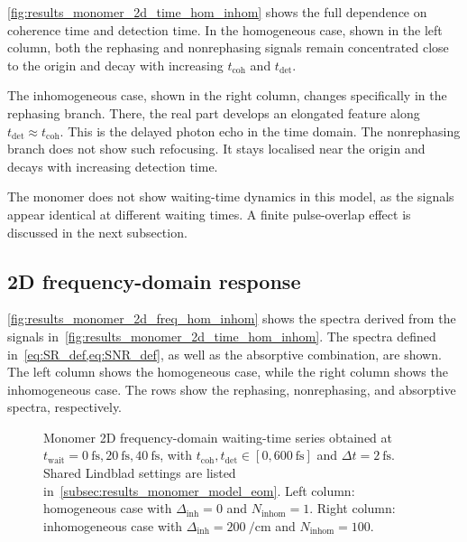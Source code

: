 \autoref{fig:results_monomer_2d_time_hom_inhom} shows the full dependence on coherence time and detection time. In the homogeneous case, shown in the left column, both the rephasing and nonrephasing signals remain concentrated close to the origin and decay with increasing $t_{\mathrm{coh}}$ and $t_{\mathrm{det}}$.

The inhomogeneous case, shown in the right column, changes specifically in the rephasing branch. There, the real part develops an elongated feature along $t_{\mathrm{det}} \approx t_{\mathrm{coh}}$. This is the delayed photon echo in the time domain. The nonrephasing branch does not show such refocusing. It stays localised near the origin and decays with increasing detection time.

The monomer does not show waiting-time dynamics in this model, as the signals appear identical at different waiting times. A finite pulse-overlap effect is discussed in the next subsection.

\subsection{2D frequency-domain response}
\label{subsec:results_monomer_2d_freq}

\autoref{fig:results_monomer_2d_freq_hom_inhom} shows the spectra derived from the signals in~\autoref{fig:results_monomer_2d_time_hom_inhom}. The spectra defined in~\autoref{eq:SR_def,eq:SNR_def}, as well as the absorptive combination, are shown. The left column shows the homogeneous case, while the right column shows the inhomogeneous case. The rows show the rephasing, nonrephasing, and absorptive spectra, respectively.

\begin{figure}[htbp]
    \centering
  \caption{Monomer 2D frequency-domain waiting-time series obtained at $t_{\mathrm{wait}}=\SI{0}{\femto\second},\SI{20}{\femto\second},\SI{40}{\femto\second}$, with $t_{\mathrm{coh}},t_{\mathrm{det}}\in[0,\SI{600}{\femto\second}]$ and $\Delta t=\SI{2}{\femto\second}$. Shared Lindblad settings are listed in~\autoref{subsec:results_monomer_model_eom}. Left column: homogeneous case with $\Delta_{\mathrm{inh}}=0$ and $N_{\mathrm{inhom}}=1$. Right column: inhomogeneous case with $\Delta_{\mathrm{inh}}=\SI{200}{\per\centi\metre}$ and $N_{\mathrm{inhom}}=100$.}
    \label{fig:results_monomer_2d_freq_hom_inhom}
\end{figure}

